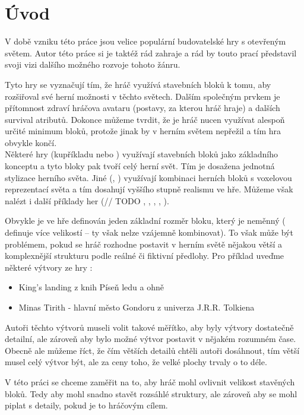 
\chapter{Úvod}

V době vzniku této práce jsou velice populární budovatelské hry s otevřeným světem. Autor této práce si je taktéž rád zahraje a rád by touto prací představil svoji vizi dalšího možného rozvoje tohoto žánru.

Tyto hry se vyznačují tím, že hráč využívá stavebních bloků k tomu, aby rozšiřoval své herní možnosti v těchto světech. Dalším společným prvkem je přítomnost zdraví hráčova avataru (postavy, za kterou hráč hraje) a dalších survival atributů. Dokonce můžeme tvrdit, že je hráč nucen využívat alespoň určité minimum bloků, protože jinak by v herním světem nepřežil a tím hra obvykle končí. \\


Některé hry (kupříkladu \MC{} nebo \TE{}) využívají stavebních bloků jako základního konceptu a tyto bloky pak tvoří celý herní svět. Tím je dosažena jednotná stylizace herního světa. Jiné (\SE{}, \ME{}) využívají kombinaci herních bloků s voxelovou reprezentací světa a tím dosahují vyššího stupně realismu ve hře.
Můžeme však nalézt i další příklady her (// TODO \TM{}, \NI{}, \PN{}, \ARK{}, \NMS{}).

Obvykle je ve hře definován jeden základní rozměr bloku, který je neměnný (\SE{} definuje více velikostí -- ty však nelze vzájemně kombinovat). To však může být problémem, pokud se hráč rozhodne postavit v herním světě nějakou větší a komplexnější strukturu podle reálné či fiktivní předlohy. Pro příklad uveďme některé výtvory ze hry \MC{}:
\begin{itemize}
	\item King's landing z knih Píseň ledu a ohně
	\item Minas Tirith - hlavní město Gondoru z univerza J.R.R. Tolkiena
\end{itemize}

Autoři těchto výtvorů museli volit takové měřítko, aby byly výtvory dostatečně detailní, ale zároveň aby bylo možné výtvor postavit v nějakém rozumném čase. Obecně ale můžeme říct, že čím větších detailů chtěli autoři dosáhnout, tím větší musel celý výtvor být, ale za ceny toho, že velké plochy trvaly o to déle.

V této práci se chceme zaměřit na to, aby hráč mohl ovlivnit velikost stavěných bloků. Tedy aby mohl snadno stavět rozsáhlé struktury, ale zároveň aby se mohl piplat s detaily, pokud je to hráčovým cílem.

